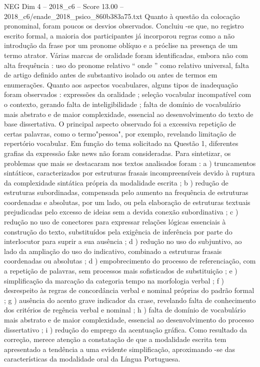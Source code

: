 \begin{textsample}{NEG Dim 4 – 2018\_c6 – Score 13.00 – 2018\_c6/enade\_2018\_psico\_860b383a75.txt}
Quanto à questão da colocação pronominal, foram poucos os desvios observados.
Concluiu -se que, no registro escrito formal, a maioria dos participantes já incorporou regras como a não introdução da frase por um pronome oblíquo e a próclise na presença de um termo atrator.
Várias marcas de oralidade foram identificadas, embora não com alta frequência : uso do pronome relativo “ onde ” como relativo universal, falta de artigo definido antes de substantivo isolado ou antes de termos em enumerações.
Quanto aos aspectos vocabulares, alguns tipos de inadequação foram observados : expressões da oralidade ; seleção vocabular incompatível com o contexto, gerando falta de inteligibilidade ; falta de domínio de vocabulário mais abstrato e de maior complexidade, essencial ao desenvolvimento do texto de base dissertativa.
O principal aspecto observado foi a excessiva repetição de certas palavras, como o termo"pessoa", por exemplo, revelando limitação de repertório vocabular.
Em função do tema solicitado na Questão 1, diferentes grafias da expressão fake news não foram consideradas.
Para sintetizar, os problemas que mais se destacaram nos textos analisados foram : a ) truncamentos sintáticos, caracterizados por estruturas frasais incompreensíveis devido à ruptura da complexidade sintática própria da modalidade escrita ; b ) redução de estruturas subordinadas, compensada pelo aumento na frequência de estruturas coordenadas e absolutas, por um lado, ou pela elaboração de estruturas textuais prejudicadas pelo excesso de ideias sem a devida conexão subordinativa ; c ) redução no uso de conectores para expressar relações lógicas essenciais à construção do texto, substituídos pela exigência de inferência por parte do interlocutor para suprir a sua ausência ; d ) redução no uso do subjuntivo, ao lado da ampliação do uso do indicativo, combinado a estruturas frasais coordenadas ou absolutas ; d ) empobrecimento do processo de referenciação, com a repetição de palavras, sem processos mais sofisticados de substituição ; e ) simplificação da marcação da categoria tempo na morfologia verbal ; f ) desrespeito às regras de concordância verbal e nominal próprias do padrão formal ; g ) ausência do acento grave indicador da crase, revelando falta de conhecimento dos critérios de regência verbal e nominal ; h ) falta de domínio de vocabulário mais abstrato e de maior complexidade, essencial ao desenvolvimento do processo dissertativo ; i ) redução do emprego da acentuação gráfica.
Como resultado da correção, merece atenção a constatação de que a modalidade escrita tem apresentado a tendência a uma evidente simplificação, aproximando -se das características da modalidade oral da Língua Portuguesa.

\end{textsample}
